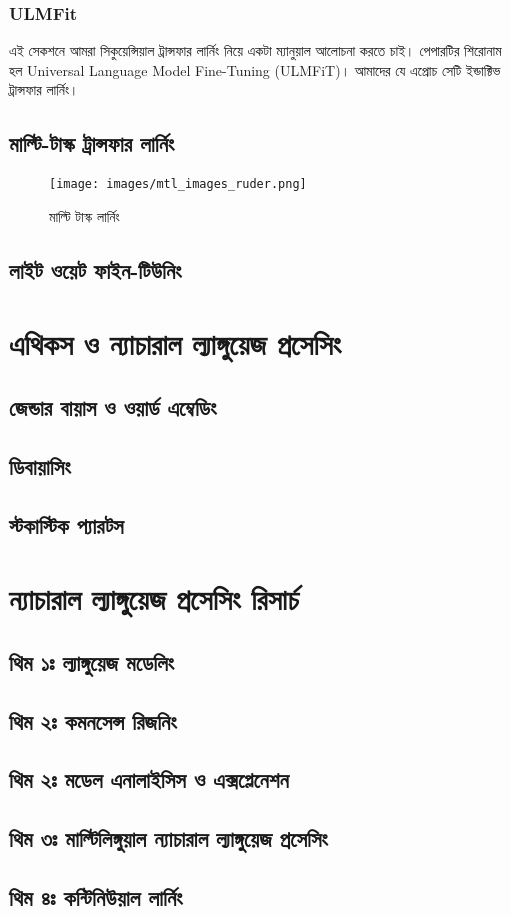 \documentclass{article}[book]
\begin{document}
\subsubsection{ULMFit} 
এই সেকশনে আমরা সিকুয়েন্সিয়াল ট্রান্সফার লার্নিং নিয়ে একটা ম্যানুয়াল আলোচনা করতে চাই। পেপারটির শিরোনাম হল Universal Language Model Fine-Tuning (ULMFiT)। আমাদের যে এপ্রোচ সেটি ইন্ডাক্টিভ ট্রান্সফার লার্নিং। 



\subsection{মাল্টি-টাস্ক ট্রান্সফার লার্নিং}

\begin{figure}[htbp] %
   \centering
   \texttt{[image: images/mtl\_images\_ruder.png]} 
   \caption{মাল্টি টাস্ক লার্নিং}
   \label{fig:ruder_mtl}
\end{figure} 
\subsection{লাইট ওয়েট ফাইন-টিউনিং}

\section{এথিকস ও ন্যাচারাল ল্যাঙ্গুয়েজ প্রসেসিং}
\subsection{জেন্ডার বায়াস ও ওয়ার্ড  এম্বেডিং}
\subsection{ডিবায়াসিং}
\subsection{স্টকাস্টিক প্যারটস}

\section{ন্যাচারাল ল্যাঙ্গুয়েজ প্রসেসিং রিসার্চ}
\subsection{থিম ১ঃ ল্যাঙ্গুয়েজ মডেলিং}
\subsection{থিম ২ঃ কমনসেন্স রিজনিং}
\subsection{থিম ২ঃ মডেল এনালাইসিস ও এক্সপ্লেনেশন}
\subsection{থিম ৩ঃ  মাল্টিলিঙ্গুয়াল ন্যাচারাল ল্যাঙ্গুয়েজ প্রসেসিং} 
\subsection{থিম ৪ঃ কন্টিনিউয়াল লার্নিং}




\end{document}
